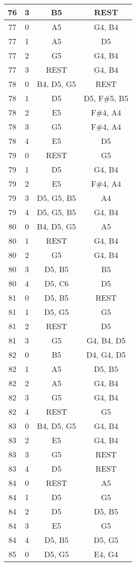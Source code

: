 \documentclass{article}
\begin{document}
\begin{longtable}{|c|c|c|c|}
76 & 3 & B5 & REST \\ 
\hline
77 & 0 & A5 & G4, B4 \\ 
77 & 1 & A5 & D5 \\ 
77 & 2 & G5 & G4, B4 \\ 
77 & 3 & REST & G4, B4 \\ 
\hline
78 & 0 & B4, D5, G5 & REST \\ 
78 & 1 & D5 & D5, F\#5, B5 \\ 
78 & 2 & E5 & F\#4, A4 \\ 
78 & 3 & G5 & F\#4, A4 \\ 
78 & 4 & E5 & D5 \\ 
\hline
79 & 0 & REST & G5 \\ 
79 & 1 & D5 & G4, B4 \\ 
79 & 2 & E5 & F\#4, A4 \\ 
79 & 3 & D5, G5, B5 & A4 \\ 
79 & 4 & D5, G5, B5 & G4, B4 \\ 
\hline
80 & 0 & B4, D5, G5 & A5 \\ 
80 & 1 & REST & G4, B4 \\ 
80 & 2 & G5 & G4, B4 \\ 
80 & 3 & D5, B5 & B5 \\ 
80 & 4 & D5, C6 & D5 \\ 
\hline
81 & 0 & D5, B5 & REST \\ 
81 & 1 & D5, G5 & G5 \\ 
81 & 2 & REST & D5 \\ 
81 & 3 & G5 & G4, B4, D5 \\ 
\hline
82 & 0 & B5 & D4, G4, D5 \\ 
82 & 1 & A5 & D5, B5 \\ 
82 & 2 & A5 & G4, B4 \\ 
82 & 3 & G5 & G4, B4 \\ 
82 & 4 & REST & G5 \\ 
\hline
83 & 0 & B4, D5, G5 & G4, B4 \\ 
83 & 2 & E5 & G4, B4 \\ 
83 & 3 & G5 & REST \\ 
83 & 4 & D5 & REST \\ 
\hline
84 & 0 & REST & A5 \\ 
84 & 1 & D5 & G5 \\ 
84 & 2 & D5 & D5, B5 \\ 
84 & 3 & E5 & G5 \\ 
84 & 4 & D5, B5 & D5, G5 \\ 
\hline
85 & 0 & D5, G5 & E4, G4 \\ 

\end{longtable}
\end{document}
